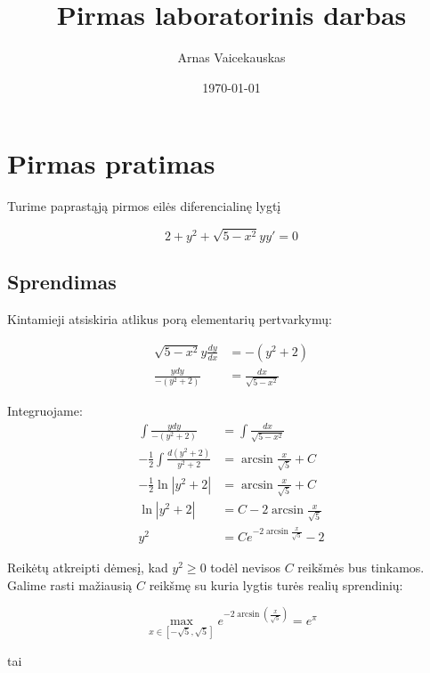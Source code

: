 \documentclass[11pt]{article}
\title{ Pirmas laboratorinis darbas}
\author{ Arnas Vaicekauskas }
\date{\today}
\begin{document}
\maketitle

\section{Pirmas pratimas}

Turime paprastąją pirmos eilės diferencialinę lygtį

$$
2+y^2+\sqrt{5-x^2}yy'=0
$$


\subsection{Sprendimas}

Kintamieji atsiskiria atlikus porą elementarių pertvarkymų:

\begin{equation}
\begin{split}
\sqrt{5-x^2}y\frac{dy}{dx}&=-(y^2+2) \\
\frac{ydy}{-(y^2+2)}&=\frac{dx}{\sqrt{5-x^2}}
\end{split}
\end{equation}

Integruojame:
\begin{equation}
    \begin{split}
        \int\frac{ydy}{-(y^2+2)}&=\int\frac{dx}{\sqrt{5-x^2}} \\
        -\frac{1}{2}\int\frac{d(y^2+2)}{y^2+2}&=\arcsin{\frac{x}{\sqrt{5}}}+C\\
        -\frac{1}{2}\ln|y^2+2|&=\arcsin{\frac{x}{\sqrt{5}}}+C\\
        \ln|y^2+2|&=C-2\arcsin{\frac{x}{\sqrt{5}}}\\
        y^2&=Ce^{-2\arcsin{\frac{x}{\sqrt{5}}}} - 2
    \end{split}
\end{equation}


Reikėtų atkreipti dėmesį, kad $y^2\geqslant 0$ todėl 
nevisos $C$ reikšmės bus tinkamos. Galime rasti mažiausią $C$
reikšmę su kuria lygtis turės realių sprendinių:

\begin{equation}
\max_{x\in[-\sqrt{5}, \sqrt{5}]} e^{-2\arcsin(\frac{x}{\sqrt 5})} = e^{\pi}
\end{equation}

tai
\end{document}
